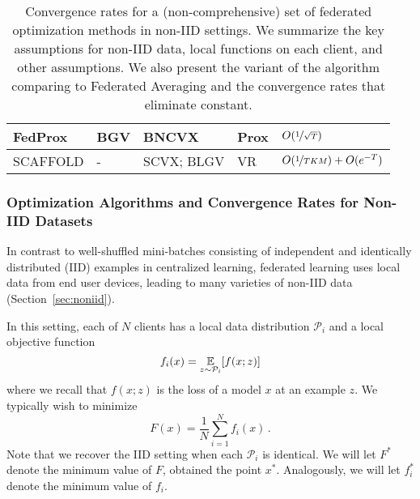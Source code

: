 \begin{table}
\begin{center}
\begin{tabularx}{\textwidth}{llllX}
FedProx \citep{li2018federated} & BGV & BNCVX & Prox &$O(\nicefrac{1}{\sqrt{T}})$\\
\hline
SCAFFOLD \citep{karimireddy2019scaffold} & - & SCVX; BLGV & VR & $O(\nicefrac{1}{TKM})+O(e^{-T})$
\\
\bottomrule
\end{tabularx}
\caption{Convergence rates for a (non-comprehensive) set of federated optimization methods in non-IID settings. We summarize the key assumptions for non-IID data, local functions on each client, and other assumptions. We also present the variant of the algorithm comparing to Federated Averaging and the convergence rates that eliminate constant.
}
\label{tab:non-iid-convergence}
\end{center}
\end{table}


\subsubsection{Optimization Algorithms and Convergence Rates for Non-IID Datasets}\label{sec:non-iid-algs}

In contrast to well-shuffled mini-batches consisting of independent and identically distributed (IID) examples in centralized learning, federated learning uses local data from end user devices, leading to many varieties of non-IID data (Section~\ref{sec:noniid}).

In this setting, each of $N$ clients has a local data distribution $\mathcal{P}_i$ and a local objective function
$$f_i(x) = \operatorname*{\mathbb{E}}_{z \sim \mathcal{P}_i}[ f(x ; z)]$$
where we recall that $f(x ; z)$ is the loss of a model $x$ at an example $z$. We typically wish to minimize
\begin{equation}
F(x) = \frac{1}{N}\sum_{i=1}^N f_i(x) \,.
\end{equation}
Note that we recover the IID setting when each $\mathcal{P}_i$ is identical. We will let $F^*$ denote the minimum value of $F$, obtained the point $x^*$. Analogously, we will let $f_i^*$ denote the minimum value of $f_i$.

